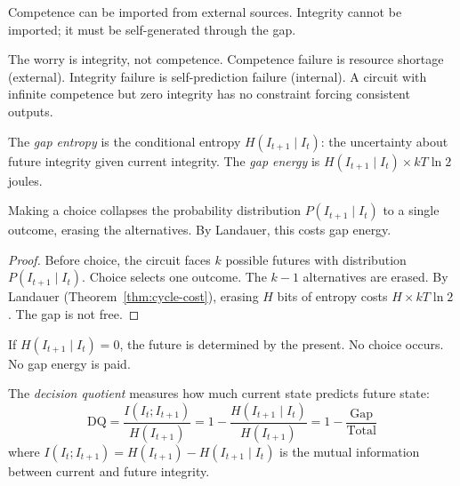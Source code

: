 \begin{corollary}\label{cor:import-asymmetry}
Competence can be imported from external sources. Integrity cannot be imported; it must be self-generated through the gap.
\end{corollary}

\begin{remark}
The worry is integrity, not competence. Competence failure is resource shortage (external). Integrity failure is self-prediction failure (internal). A circuit with infinite competence but zero integrity has no constraint forcing consistent outputs.
\end{remark}

\begin{definition}\label{def:gap-energy}
The \emph{gap entropy} is the conditional entropy $H(I_{t+1} \mid I_t)$: the uncertainty about future integrity given current integrity. The \emph{gap energy} is $H(I_{t+1} \mid I_t) \times kT\ln 2$ joules.
\end{definition}

\begin{theorem}\label{thm:choice-pays}
Making a choice collapses the probability distribution $P(I_{t+1} \mid I_t)$ to a single outcome, erasing the alternatives. By Landauer, this costs gap energy.
\end{theorem}

\begin{proof}
Before choice, the circuit faces $k$ possible futures with distribution $P(I_{t+1} \mid I_t)$. Choice selects one outcome. The $k-1$ alternatives are erased. By Landauer (Theorem~\ref{thm:cycle-cost}), erasing $H$ bits of entropy costs $H \times kT\ln 2$. The gap is not free.
\end{proof}

\begin{corollary}\label{cor:zero-gap}
If $H(I_{t+1} \mid I_t) = 0$, the future is determined by the present. No choice occurs. No gap energy is paid.
\end{corollary}

\begin{definition}\label{def:dq-from-gap}
The \emph{decision quotient} measures how much current state predicts future state:
\[
  \mathrm{DQ} = \frac{I(I_t; I_{t+1})}{H(I_{t+1})} = 1 - \frac{H(I_{t+1} \mid I_t)}{H(I_{t+1})} = 1 - \frac{\text{Gap}}{\text{Total}}
\]
where $I(I_t; I_{t+1}) = H(I_{t+1}) - H(I_{t+1} \mid I_t)$ is the mutual information between current and future integrity.
\end{definition}

